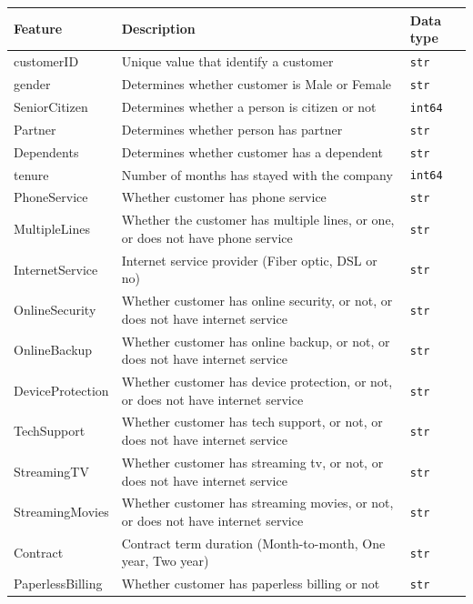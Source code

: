 \documentclass{article}
\begin{document}
\begin{table}[H]
\centering
\renewcommand{\arraystretch}{1.3}
\begin{tabularx}{\textwidth}{|l|X|l|}
\hline
\textbf{Feature} & \textbf{Description} & \textbf{Data type} \\ \hline
customerID & Unique value that identify a customer & \texttt{str} \\ \hline
gender & Determines whether customer is Male or Female & \texttt{str} \\ \hline
SeniorCitizen & Determines whether a person is citizen or not & \texttt{int64} \\ \hline
Partner & Determines whether person has partner & \texttt{str} \\ \hline
Dependents & Determines whether customer has a dependent & \texttt{str} \\ \hline
tenure & Number of months has stayed with the company & \texttt{int64} \\ \hline
PhoneService & Whether customer has phone service & \texttt{str} \\ \hline
MultipleLines & Whether the customer has multiple lines, or one, or does not have phone service & \texttt{str} \\ \hline
InternetService & Internet service provider (Fiber optic, DSL or no) & \texttt{str} \\ \hline
OnlineSecurity & Whether customer has online security, or not, or does not have internet service & \texttt{str} \\ \hline
OnlineBackup & Whether customer has online backup, or not, or does not have internet service & \texttt{str} \\ \hline
DeviceProtection & Whether customer has device protection, or not, or does not have internet service & \texttt{str} \\ \hline
TechSupport & Whether customer has tech support, or not, or does not have internet service & \texttt{str} \\ \hline
StreamingTV & Whether customer has streaming tv, or not, or does not have internet service & \texttt{str} \\ \hline
StreamingMovies & Whether customer has streaming movies, or not, or does not have internet service & \texttt{str} \\ \hline
Contract & Contract term duration (Month-to-month, One year, Two year) & \texttt{str} \\ \hline
PaperlessBilling & Whether customer has paperless billing or not & \texttt{str} \\ \hline

\end{tabularx}
\end{table}
\end{document}
